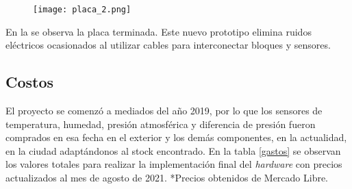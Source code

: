\begin{figure}[H]
	\centering
	\texttt{[image: placa\_2.png]}
	\label{fig:hardBloq}
\end{figure}

En la  se observa la placa terminada. Este nuevo prototipo elimina ruidos eléctricos ocasionados al utilizar cables para interconectar bloques y sensores.


\subsection{Costos}
El proyecto se comenzó a mediados del año 2019, por lo que los sensores de temperatura, humedad, 
presión atmosférica y diferencia de presión fueron comprados en esa fecha en el exterior y los demás componentes, en la actualidad, en la ciudad adaptándonos al stock encontrado. En la tabla \ref{gastos} se observan los valores totales para realizar la implementación final del \textit{hardware} con precios actualizados al mes de agosto de 2021. *Precios obtenidos de Mercado Libre.


